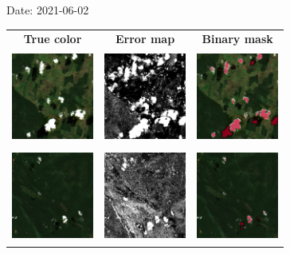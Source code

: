 \documentclass{beamer}
\begin{document}
\begin{frame}{Date: 2021-06-02}
    \begin{tabular}{ccc}
        \textbf{True color} & \textbf{Error map} & \textbf{Binary mask}\\
        \includegraphics[width=2.7cm,height=3cm]{Figures/v6/20210602/TCI_zoom1.png}& \includegraphics[width=2.7cm,height=3cm]{Figures/v6/20210602/error_map_zoom1.png} &\includegraphics[width=2.7cm,height=3cm]{Figures/v6/20210602/zoom1_BI.png}\\
        \includegraphics[width=2.7cm,height=3cm]{Figures/v6/20210602/TCI_zoom2.png}& \includegraphics[width=2.7cm,height=3cm]{Figures/v6/20210602/error_map_zoom2.png} &\includegraphics[width=2.7cm,height=3cm]{Figures/v6/20210602/zoom2_BI.png}\\
        \end{tabular}
\end{frame}
\end{document}
